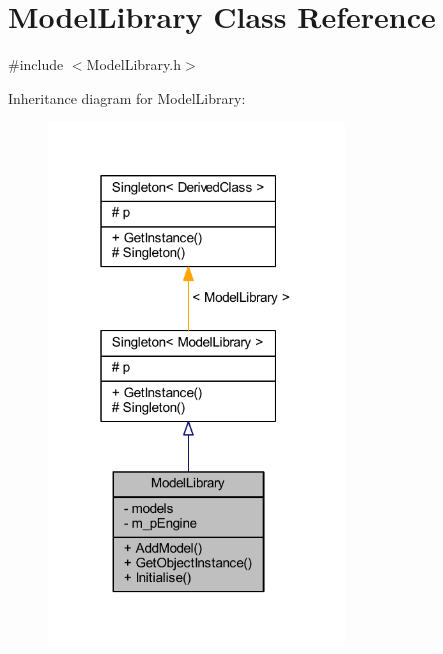 \hypertarget{class_model_library}{}\section{Model\+Library Class Reference}
\label{class_model_library}


{\ttfamily \#include $<$Model\+Library.\+h$>$}



Inheritance diagram for Model\+Library\+:\nopagebreak
\begin{figure}[H]
\begin{center}
\leavevmode
\includegraphics[width=223pt]{class_model_library__inherit__graph}
\end{center}
\end{figure}


